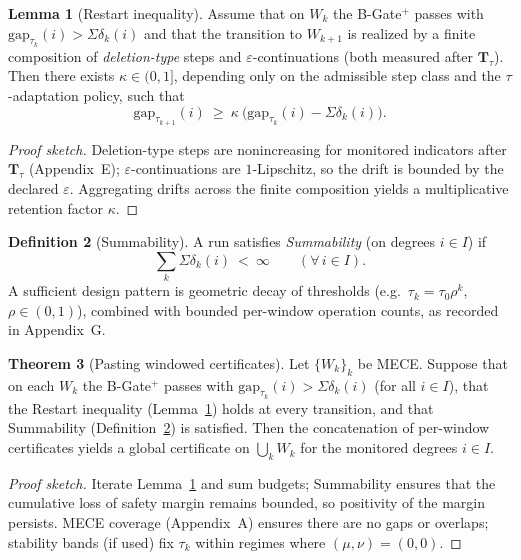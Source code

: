 \documentclass[11pt]{article}
\numberwithin{equation}{section}
\theoremstyle{plain}
\theoremstyle{definition}
\theoremstyle{remark}
\theoremstyle{plain}
\theoremstyle{definition}
\numberwithin{equation}{section}
\newtheorem{theorem}{Theorem}[section]
\newtheorem{lemma}[theorem]{Lemma}
\theoremstyle{definition}
\newtheorem{definition}[theorem]{Definition}
\numberwithin{equation}{section}
\theoremstyle{plain}
\theoremstyle{definition}
\theoremstyle{remark}
\begin{document}
\begin{lemma}[Restart inequality]\label{J:lem:restart}
Assume that on \(W_k\) the B-Gate\(^{+}\) passes with \(\mathrm{gap}_{\tau_k}(i)>\Sigma\delta_k(i)\) and that the transition to \(W_{k+1}\) is realized by a finite composition of \emph{deletion-type} steps and \(\varepsilon\)-continuations (both measured after \(\mathbf{T}_\tau\)). Then there exists \(\kappa\in(0,1]\), depending only on the admissible step class and the \(\tau\)-adaptation policy, such that
\[
\mathrm{gap}_{\tau_{k+1}}(i)\ \ge\ \kappa\ \bigl(\mathrm{gap}_{\tau_k}(i)-\Sigma\delta_k(i)\bigr).
\]
\end{lemma}

\begin{proof}[Proof sketch]
Deletion-type steps are nonincreasing for monitored indicators after \(\mathbf{T}_\tau\) (Appendix~E); \(\varepsilon\)-continuations are \(1\)-Lipschitz, so the drift is bounded by the declared \(\varepsilon\). Aggregating drifts across the finite composition yields a multiplicative retention factor \(\kappa\).
\end{proof}

\begin{definition}[Summability]\label{J:def:summability}
A run satisfies \emph{Summability} (on degrees \(i\in I\)) if
\[
\sum_{k}\Sigma\delta_k(i)\ <\ \infty\qquad(\forall\,i\in I).
\]
A sufficient design pattern is geometric decay of thresholds (e.g.\ \(\tau_k=\tau_0\rho^k\), \(\rho\in(0,1)\)), combined with bounded per-window operation counts, as recorded in Appendix~G.
\end{definition}

\begin{theorem}[Pasting windowed certificates]\label{J:thm:pasting}
Let \(\{W_k\}_k\) be MECE. Suppose that on each \(W_k\) the B-Gate\(^{+}\) passes with \(\mathrm{gap}_{\tau_k}(i)>\Sigma\delta_k(i)\) (for all \(i\in I\)), that the Restart inequality (Lemma~\ref{J:lem:restart}) holds at every transition, and that Summability (Definition~\ref{J:def:summability}) is satisfied. Then the concatenation of per-window certificates yields a global certificate on \(\bigcup_k W_k\) for the monitored degrees \(i\in I\).
\end{theorem}

\begin{proof}[Proof sketch]
Iterate Lemma~\ref{J:lem:restart} and sum budgets; Summability ensures that the cumulative loss of safety margin remains bounded, so positivity of the margin persists. MECE coverage (Appendix~A) ensures there are no gaps or overlaps; stability bands (if used) fix \(\tau_k\) within regimes where \((\mu,\nu)=(0,0)\).
\end{proof}
\end{document}
